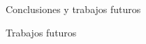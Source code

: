 \begin{chapter}{Conclusiones y trabajos futuros}
\begin{section}{Trabajos futuros}




    \end{section}
\end{chapter}